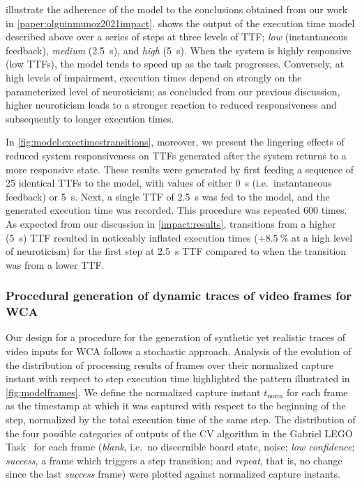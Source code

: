  illustrate the adherence of the model to the conclusions obtained from our work in \cref{paper:olguinmunoz2021impact}.
 shows the output of the execution time model described above over a series of steps at three levels of \gls{TTF};
\emph{low} (instantaneous feedback), \emph{medium} (\SI{2.5}{\second}), and \emph{high} (\SI{5}{\second}).
When the system is highly responsive (low \glspl{TTF}), the model tends to speed up as the task progresses.
Conversely, at high levels of impairment, execution times depend on strongly on the parameterized level of neuroticism;
as concluded from our previous discussion, higher neuroticism leads to a stronger reaction to reduced responsiveness and subsequently to longer execution times.

In \cref{fig:model:exectimestransitions}, moreover, we present the lingering effects of reduced system responsiveness on \glspl{TTF} generated after the system returns to a more responsive state.
These results were generated by first feeding a sequence of \num{25} identical \glspl{TTF} to the model, with values of either \SI{0}{\second} (i.e.\ instantaneous feedback) or \SI{5}{\second}.
Next, a single \gls{TTF} of \SI{2.5}{\second} was fed to the model, and the generated execution time was recorded.
This procedure was repeated \num{600} times.
As expected from our discussion in \cref{impact:results}, transitions from a higher (\SI{5}{\second}) \gls{TTF} resulted in noticeably inflated execution times (\ensuremath{+\SI{8.5}{\percent}} at a high level of neuroticism) for the first step at \SI{2.5}{\second} \gls{TTF} compared to when the transition was from a lower \gls{TTF}.

\subsubsection{Procedural generation of dynamic traces of video frames for \acs{WCA}}\label{model:traces}

Our design for a procedure for the generation of synthetic yet realistic traces of video inputs for \gls{WCA} follows a stochastic approach.
Analysis of the evolution of the distribution of processing results of frames over their normalized capture instant with respect to step execution time highlighted the pattern illustrated in \cref{fig:modelframes}.
We define the normalized capture instant \ensuremath{t_\text{norm}} for each frame as the timestamp at which it was captured with respect to the beginning of the step, normalized by the total execution time of the same step.
The distribution of the four possible categories of outputs of the \gls{CV} algorithm in the Gabriel LEGO Task~\cite{chen2018application} for each frame (\emph{blank}, i.e.\ no discernible board state, noise; \emph{low confidence}; \emph{success}, a frame which triggers a step transition;
and \emph{repeat}, that is, no change since the last \emph{success} frame) were plotted against normalized capture instants.

